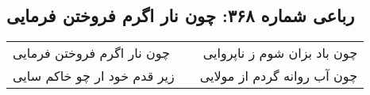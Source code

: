 \begin{center}
\section*{رباعی شماره ۳۶۸: چون نار اگرم فروختن فرمایی}
\label{sec:sh368}
\begin{longtable}{l p{0.5cm} r}
چون نار اگرم فروختن فرمایی
&&
چون باد بزان شوم ز ناپروایی
\\
زیر قدم خود ار چو خاکم سایی
&&
چون آب روانه گردم از مولایی
\\
\end{longtable}
\end{center}
